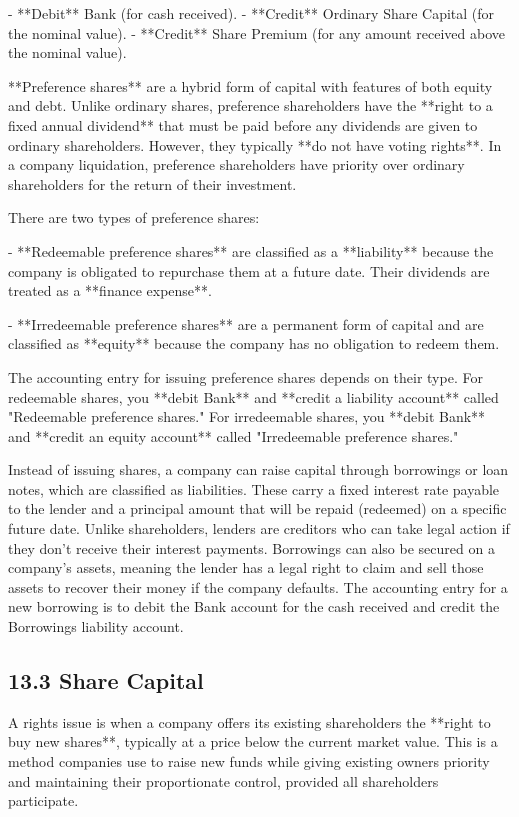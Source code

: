 - **Debit** Bank (for cash received).
- **Credit** Ordinary Share Capital (for the nominal value).
- **Credit** Share Premium (for any amount received above the nominal value).

**Preference shares** are a hybrid form of capital with features of both equity and debt. Unlike ordinary shares, preference shareholders have the **right to a fixed annual dividend** that must be paid before any dividends are given to ordinary shareholders. However, they typically **do not have voting rights**. In a company liquidation, preference shareholders have priority over ordinary shareholders for the return of their investment.

There are two types of preference shares:

- **Redeemable preference shares** are classified as a **liability** because the company is obligated to repurchase them at a future date. Their dividends are treated as a **finance expense**.
    
- **Irredeemable preference shares** are a permanent form of capital and are classified as **equity** because the company has no obligation to redeem them.
    
The accounting entry for issuing preference shares depends on their type. For redeemable shares, you **debit Bank** and **credit a liability account** called "Redeemable preference shares." For irredeemable shares, you **debit Bank** and **credit an equity account** called "Irredeemable preference shares."

Instead of issuing shares, a company can raise capital through borrowings or loan notes, which are classified as liabilities. These carry a fixed interest rate payable to the lender and a principal amount that will be repaid (redeemed) on a specific future date. Unlike shareholders, lenders are creditors who can take legal action if they don't receive their interest payments. Borrowings can also be secured on a company's assets, meaning the lender has a legal right to claim and sell those assets to recover their money if the company defaults. The accounting entry for a new borrowing is to debit the Bank account for the cash received and credit the Borrowings liability account.

\subsection{13.3 Share Capital}

A rights issue is when a company offers its existing shareholders the **right to buy new shares**, typically at a price below the current market value. This is a method companies use to raise new funds while giving existing owners priority and maintaining their proportionate control, provided all shareholders participate.

